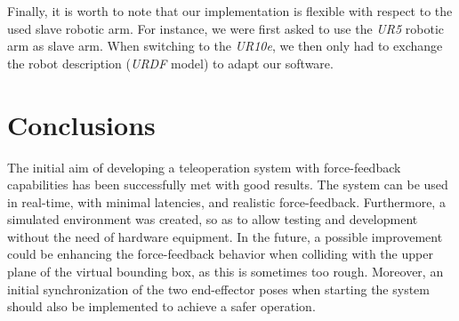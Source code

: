 \documentclass[runningheads]{llncs}
\begin{document}
Finally, it is worth to note that our implementation is flexible with respect to the used slave robotic arm. For instance, we were first asked to use the \textit{UR5} robotic arm as slave arm. When switching to the \textit{UR10e}, we then only had to exchange the robot description (\textit{URDF} model) to adapt our software.

\section{Conclusions}

The initial aim of developing a teleoperation system with force-feedback capabilities has been successfully met with good results. The system can be used in real-time, with minimal latencies, and realistic force-feedback. Furthermore, a simulated environment was created, so as to allow testing and development without the need of hardware equipment. In the future, a possible improvement could be enhancing the force-feedback behavior when colliding with the upper plane of the virtual bounding box, as this is sometimes too rough. Moreover, an initial synchronization of the two end-effector poses when starting the system should also be implemented to achieve a safer operation.


\end{document}
